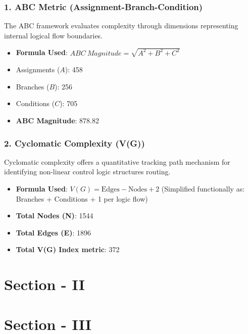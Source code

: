 \documentclass[12pt]{article}
\begin{document}
\subsubsection{1. ABC Metric (Assignment-Branch-Condition)}
The ABC framework evaluates complexity through dimensions representing internal logical flow boundaries.
\begin{itemize}
    \item \textbf{Formula Used}: $ABC\ Magnitude = \sqrt{A^2 + B^2 + C^2}$
    \item Assignments ($A$): 458
    \item Branches ($B$): 256
    \item Conditions ($C$): 705
    \item \textbf{ABC Magnitude}: 878.82
\end{itemize}

\subsubsection{2. Cyclomatic Complexity (V(G))}
Cyclomatic complexity offers a quantitative tracking path mechanism for identifying non-linear control logic structures routing.
\begin{itemize}
    \item \textbf{Formula Used}: $V(G) = \text{Edges} - \text{Nodes} + 2$ (Simplified functionally as: Branches + Conditions + 1 per logic flow)
    \item \textbf{Total Nodes (N)}: 1544
    \item \textbf{Total Edges (E)}: 1896
    \item \textbf{Total V(G) Index metric}: 372
\end{itemize}

\newpage
\section{Section - II}


\section{Section - III}
\end{document}
